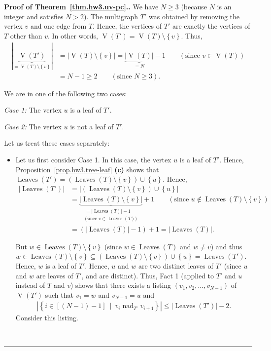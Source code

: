 \documentclass[numbers=enddot,12pt,final,onecolumn,notitlepage]{scrartcl}%
\theoremstyle{definition}
\newenvironment{proof}[1][Proof]{\noindent\textbf{#1.} }{\ \rule{0.5em}{0.5em}}
\newcommand{\set}[1]{\left\{ #1 \right\}}
\newcommand{\abs}[1]{\left| #1 \right|}
\newcommand{\tup}[1]{\left( #1 \right)}
\newcommand{\ive}[1]{\left[ #1 \right]}
\newcommand{\verts}[1]{\operatorname{V}\left( #1 \right)}
\newcommand{\leaves}[1]{\operatorname{Leaves}\left( #1 \right)}
\newcommand{\underbrack}[2]{\underbrace{#1}_{\substack{#2}}}
\begin{document}
\begin{proof}[Proof of Theorem~\ref{thm.hw3.uv-pc}.]
We have $N \geq 3$ (because $N$ is an integer and satisfies $N > 2$).
The multigraph $T'$ was obtained by removing the vertex $v$ and one
edge from $T$.
Hence, the vertices of $T'$ are exactly the vertices of $T$ other than
$v$.
In other words, $\verts{T'} = \verts{T} \setminus \set{v}$.
Thus,
\begin{align*}
\abs{\underbrace{\verts{T'}}_{= \verts{T} \setminus \set{v}}}
&= \abs{\verts{T} \setminus \set{v}}
= \underbrace{\abs{\verts{T}}}_{= N} - 1
\qquad \left(\text{since } v \in \verts{T}\right) \\
&= N - 1 \geq 2
\qquad \left(\text{since } N \geq 3 \right) .
\end{align*}

We are in one of the following two cases:

\textit{Case 1:} The vertex $u$ is a leaf of $T'$.

\textit{Case 2:} The vertex $u$ is not a leaf of $T'$.

Let us treat these cases separately:

\begin{itemize}

\item   Let us first consider Case 1.
        In this case, the vertex $u$ is a leaf of $T'$.
        Hence, Proposition~\ref{prop.hw3.tree-leaf} \textbf{(c)}
        shows that
        $\leaves{T'}
        = \tup{\leaves{T} \setminus \set{v}} \cup \set{u}$.
        Hence,
        \begin{align*}
        \abs{\leaves{T'}}
        &= \abs{\tup{\leaves{T} \setminus \set{v}} \cup \set{u}} \\
        &= \underbrack{\abs{\leaves{T} \setminus \set{v}}}
                     {= \abs{\leaves{T}} - 1 \\
                      \text{(since } v \in \leaves{T} \text{)}}
          + 1
        \qquad \left(\text{since }
                      u \notin \leaves{T} \setminus \set{v}
               \right) \\
        &= \tup{\abs{\leaves{T}} - 1} + 1 = \abs{\leaves{T}} .
        \end{align*}
        
        But $w \in \leaves{T} \setminus \set{v}$ (since
        $w \in \leaves{T}$ and $w \neq v$) and thus
        $w \in \leaves{T} \setminus \set{v}
        \subseteq \tup{\leaves{T} \setminus \set{v}} \cup \set{u}
        = \leaves{T'}$.
        Hence, $w$ is a leaf of $T'$.
        Hence, $u$ and $w$ are two distinct leaves of $T'$
        (since $u$ and $w$ are leaves of $T'$, and are distinct).
        Thus, Fact 1 (applied to $T'$ and $u$ instead of $T$ and $v$)
        shows that there exists a listing
        $\tup{v_1, v_2, \ldots, v_{N-1}}$ of $\verts{T'}$ such that
        $v_1 = w$ and $v_{N-1} = u$ and
        \begin{align}
        \abs{\set{i \in \ive{\tup{N-1}-1} \ \mid \ v_i \operatorname{nad}_{T'} v_{i+1} }}
        \leq \abs{\leaves{T'}} - 2.
        \label{pf.thm.hw3.uv-pc.c1.1}
        \end{align}
        Consider this listing.
        

\end{itemize}
\end{proof}
\end{document}
